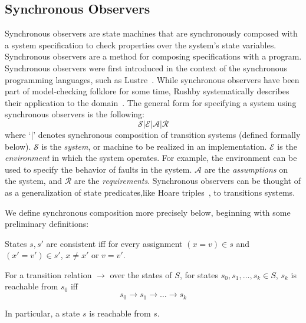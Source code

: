 \documentclass{llncs/llncs}
\newcommand{\lee}[1]{ } %
\newcommand{\lee}[1]{ {\color{blue}$<$lee: #1$>$} } %
\begin{document}
\lee{note that we don't need full generality of send and receive events in OM(1)}

\lee{note that we use calendar automata for non real-time system}

\subsection{Synchronous Observers}\label{sec:sync}
Synchronous observers are state machines that are synchronously composed with a system specification to check properties over the system's state variables. Synchronous observers are a method for composing specifications with a program. Synchronous observers were first introduced in the context of the synchronous programming languages, such as Lustre~\cite{}. While synchronous observers have been part of model-checking folklore for some time, Rushby systematically describes their application to the domain~\cite{}. The general form for specifying a system using synchronous observers is the following:
$$\mathcal{S} | \mathcal{E} | \mathcal{A} | \mathcal{R}$$
\noindent
where `$|$' denotes synchronous composition of transition systems (defined formally below). $\mathcal{S}$ is the \emph{system}, or machine to be realized in an implementation. $\mathcal{E}$ is the \emph{environment} in which the system operates. For example, the environment can be used to specify the behavior of faults in the system. $\mathcal{A}$ are the \emph{assumptions} on the system, and $\mathcal{R}$ are the \emph{requirements}. Synchronous observers can be thought of as a generalization of state predicates,like Hoare triples~\cite{}, to transitions systems.

We define synchronous composition more precisely below, beginning with some preliminary definitions:

\begin{definition}
  States $s, s'$ are consistent iff for every assignment $(x = v) \in s$ and $(x' =
  v') \in s'$, $x \neq x'$ or $v = v'$.
\end{definition}

\begin{definition}
For a transition relation $\rightarrow$ over the states of $S$, for states $s_0, s_1, \ldots, s_k \in S$, $s_k$ is reachable from $s_0$ iff
$$s_0 \rightarrow s_1 \rightarrow \ldots \rightarrow s_k$$
\end{definition}
\noindent
In particular, a state $s$ is reachable from $s$.
\end{document}
